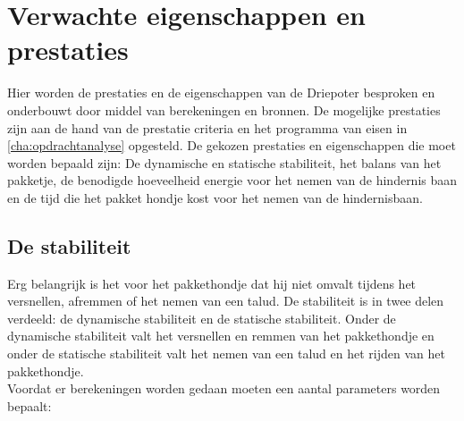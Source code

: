 \section{Verwachte eigenschappen en prestaties}
\label{se:prestatie_en_eigenschappen}
Hier worden de prestaties en de eigenschappen van de Driepoter besproken en onderbouwt door middel van berekeningen en bronnen. De mogelijke prestaties zijn aan de hand van de prestatie criteria en het programma van eisen in \cref{cha:opdrachtanalyse} opgesteld. De gekozen prestaties en eigenschappen die moet worden bepaald zijn: De dynamische en statische stabiliteit, het balans van het pakketje, de benodigde hoeveelheid energie voor het nemen van de hindernis baan en de tijd die het pakket hondje kost voor het nemen van de hindernisbaan. 

\subsection{De stabiliteit}
Erg belangrijk is het voor het pakkethondje dat hij niet omvalt tijdens het versnellen, afremmen of het nemen van een talud. De stabiliteit is in twee delen verdeeld: de dynamische stabiliteit en de statische stabiliteit. Onder de dynamische stabiliteit valt het versnellen en remmen van het pakkethondje en onder de statische stabiliteit valt het nemen van een talud en het rijden van het pakkethondje.\\
Voordat er berekeningen worden gedaan moeten een aantal parameters worden bepaalt:

